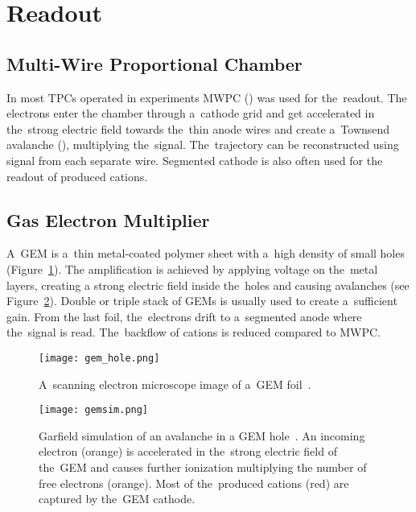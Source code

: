	\section{Readout}
		\subsection{Multi-Wire Proportional Chamber}
			In most  \ac{TPC}s operated in experiments \acf{MWPC} () was used for the~readout. The electrons enter the chamber through a~cathode grid and get accelerated in the~strong electric field towards the~thin anode wires and create a~Townsend avalanche (), multiplying the~signal.  The~trajectory can be reconstructed using signal from each separate wire. Segmented cathode is also often used for the readout of produced cations. 
			
		\subsection{Gas Electron Multiplier}
			A~\acf{GEM} is a~thin metal-coated polymer sheet with a~high density of small holes (Figure~\ref{fig:gemhole}). The amplification is achieved by applying voltage on the~metal layers, creating a strong electric field inside the~holes and causing avalanches (see Figure~\ref{fig:gemsim}). Double or triple stack of \ac{GEM}s is usually used to create a~sufficient gain. From the last foil, the~electrons drift to a~segmented anode where the~signal is read. The~backflow of cations is reduced compared to \ac{MWPC}. 
			\begin{figure}
				\centering
				\texttt{[image: gem\_hole.png]}
				\caption{A~scanning electron microscope image of a~\ac{GEM} foil~\cite{gemhole}.}
				\label{fig:gemhole}
			\end{figure}
			\begin{figure}
				\centering
				\texttt{[image: gemsim.png]}
				\caption{Garfield simulation of an avalanche in a \ac{GEM} hole~\cite{gemsim}. An incoming electron (orange) is accelerated in the~strong electric field of the~\ac{GEM} and causes further ionization multiplying the number of free electrons (orange). Most of the~produced cations (red) are captured by the~\ac{GEM} cathode.}
				\label{fig:gemsim}
			\end{figure}
		
